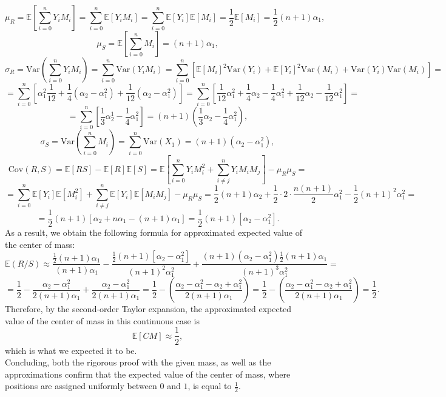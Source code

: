 \documentclass[11pt, twoside, reqno]{book}
\newcommand{\Var}{\text{Var}}
\newcommand{\Cov}{\text{Cov}}
\begin{document}
$$\mu_{R} = \mathbb{E}\left[\sum^{n}_{i=0}Y_{i}M_{i}\right]=\sum^{n}_{i=0}\mathbb{E}[Y_{i}M_{i}]=\sum^{n}_{i=0}\mathbb{E}[Y_{i}]\mathbb{E}[M_{i}]= \frac{1}{2}\mathbb{E}[M_{i}]=\frac{1}{2}(n+1)\alpha_{1},$$
$$\mu_{S} = \mathbb{E}\left[\sum^{n}_{i=0}M_{i}\right]=(n+1)\alpha_{1},$$
$$\sigma_{R} = \Var\left(\sum^{n}_{i=0}Y_{i}M_{i}\right)=\sum^{n}_{i=0}\Var(Y_{i}M_{i})=\sum^{n}_{i=0}\left[\mathbb{E}[M_{i}]^{2}\Var(Y_{i})+\mathbb{E}[Y_{i}]^{2}\Var(M_{i})+\Var(Y_{i})\Var(M_{i})\right]=$$
$$=\sum^{n}_{i=0}\left[\alpha_{1}^{2}\frac{1}{12} + \frac{1}{4} (\alpha_{2}-\alpha_{1}^{2}) + \frac{1}{12}(\alpha_{2}-\alpha_{1}^{2})\right]=\sum^{n}_{i=0}\left[\frac{1}{12}\alpha_{1}^{2}+\frac{1}{4}\alpha_{2}-\frac{1}{4}\alpha_{1}^{2}+\frac{1}{12}\alpha_{2}-\frac{1}{12}\alpha_{1}^{2}\right]=$$
$$=\sum^{n}_{i=0}\left[\frac{1}{3}\alpha_{2}^{1}-\frac{1}{4}\alpha_{1}^{2} \right]=(n+1)\left(\frac{1}{3} \alpha_{2}-\frac{1}{4}\alpha_{1}^{2}\right),$$
$$\sigma_{S}=\Var\left(\sum^{n}_{i=0}M_{i}\right)=\sum^{n}_{i=0}\Var(X_{1})=(n+1)(\alpha_{2}-\alpha_{1}^{2}),$$
$$\Cov(R,S) = \mathbb{E}[RS]-\mathbb{E}[R]\mathbb{E}[S]=\mathbb{E}\left[\sum^{n}_{i=0}Y_{i}M_{i}^{2}+\sum^{n}_{i\neq j} Y_{i}M_{i}M_{j}\right]-\mu_{R}\mu_{S}=$$
$$=\sum^{n}_{i=0}\mathbb{E}[Y_{i}]\mathbb{E}[M_{i}^{2}]+\sum^{n}_{i\neq j}\mathbb{E}[Y_{i}]\mathbb{E}[M_{i}M_{j}]-\mu_{R}\mu_{S}=\frac{1}{2}(n+1)\alpha_{2}+\frac{1}{2}\cdot 2 \cdot \frac{n(n+1)}{2}\alpha_{1}^{2}-\frac{1}{2}(n+1)^{2}\alpha_{1}^{2}=$$
$$= \frac{1}{2}(n+1)\left[\alpha_{2}+n\alpha_{1}-(n+1)\alpha_{1} \right]= \frac{1}{2}(n+1)[\alpha_{2}-\alpha_{1}^{2}].$$
As a result, we obtain the following formula for approximated expected value of the center of mass:
$$\mathbb{E}(R/S) \approx \frac{\frac{1}{2}(n+1)\alpha_{1}}{(n+1)\alpha_{1}} - \frac{\frac{1}{2}(n+1)[\alpha_{2}-\alpha_{1}^{2}]}{(n+1)^{2}\alpha_{1}^{2}}+\frac{(n+1)(\alpha_{2}-\alpha_{1}^{2})\frac{1}{2}(n+1)\alpha_{1}}{(n+1)^{3}\alpha_{1}^{2}}=$$
$$=\frac{1}{2} - \frac{\alpha_{2}-\alpha_{1}^{2}}{2(n+1)\alpha_{1}}+\frac{\alpha_{2}-\alpha_{1}^{2}}{2(n+1)\alpha_{1}}=\frac{1}{2}-\left(\frac{\alpha_{2}-\alpha_{1}^{2}-\alpha_{2}+\alpha_{1}^{2}}{2(n+1)\alpha_{1}} \right) = \frac{1}{2}-\left(\frac{\alpha_{2}-\alpha_{1}^{2}-\alpha_{2}+\alpha_{1}^{2}}{2(n+1)\alpha_{1}} \right) = \frac{1}{2}.$$
Therefore, by the second-order Taylor expansion, the approximated expected value of the center of mass in this continuous case is $$\mathbb{E}[CM] \approx \frac{1}{2},$$
which is what we expected it to be. \\
Concluding, both the rigorous proof with the given mass, as well as the approximations confirm that the expected value of the center of mass, where positions are assigned uniformly between $0$ and $1$, is equal to $\frac{1}{2}$.
\end{document}

